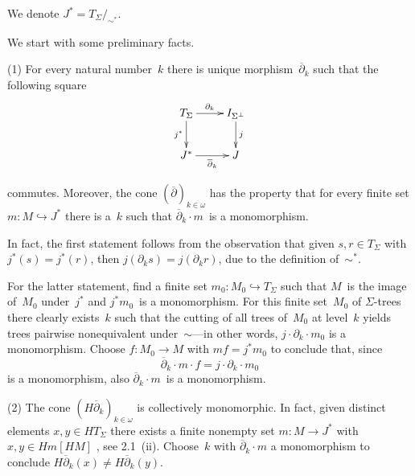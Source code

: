 \documentclass{entcs}
\newcommand{\sims}{\ensuremath{\mathrel{\sim^*}}}
\begin{document}
We denote $J^*=T_\Sigma/_{\sims}$.

\begin{pf}
We start with some preliminary facts.

(1) For every natural number~$k$ there is unique
morphism~$\overline{\partial}_k$ such that the following square
\vspace{1mm}
\[
\xy
\xymatrix{
T_\Sigma
\ar[0,1]^-{\partial_k}
\ar[1,0]_{j^*}
&
I_{\Sigma^\perp}
\ar[1,0]^{j}
\\
J^*
\ar[0,1]_-{\overline{\partial}_k}
&
J
}
\endxy
\]
\vspace{1mm}

\noindent
commutes. Moreover, the cone $(\overline{\partial})_{k\in\omega}$ has
the property that for every finite set $m\colon M\hookrightarrow
J^*$ there is a~$k$ such that $\overline{\partial}_k{\cdot}m$~is a
monomorphism.

In fact, the first statement follows from the observation that given
$s,r\in T_\Sigma$ with $j^*(s)=j^*(r)$, then
$j(\partial_ks)=j(\partial_kr)$, due to the definition of~\sims.

For the latter statement, find a finite set $m_0\colon
M_0\hookrightarrow T_\Sigma$ such that $M$~is the image of~$M_0$
under~$j^*$ and $j^*m_0$~is a monomorphism. For this finite
set~$M_0$ of $\Sigma$-trees there clearly exists~$k$ such that the
cutting of all trees of~$M_0$ at level~$k$ yields trees pairwise
nonequivalent under~$\sim$---in other words, $j{\cdot}\partial_k{\cdot}m_0$
is a monomorphism. Choose $f\colon M_0\to M$ with $mf=j^*m_0$ to
conclude that, since
\[\overline{\partial}_k{\cdot}m{\cdot}f=j{\cdot}\partial_k{\cdot}m_0\]
is a monomorphism, also $\overline{\partial}_k{\cdot}m$~is a
monomorphism.

(2) The cone $(H\overline{\partial}_k)_{k\in\omega}$ is
collectively monomorphic. In fact, given distinct elements $x,y\in
HT_\Sigma$ there exists a finite nonempty set $m\colon M\to J^*$
with $x,y \in Hm[HM]$ , see 2.1~(ii). Choose~$k$ with
$\overline{\partial}_k{\cdot}m$ a monomorphism to conclude
$H\overline{\partial}_k(x)\neq H\overline{\partial}_k(y)$.


\end{pf}
\end{document}
